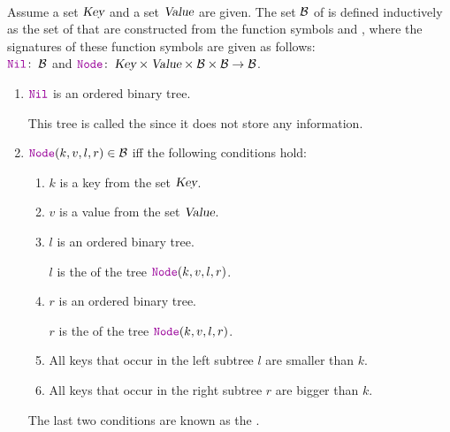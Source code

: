 \begin{Definition}  \hspace*{\fill} \\
  Assume a set $\textsl{Key}$ and a set $\textsl{Value}$ are given.
  The set $\mathcal{B}$ of   is defined
  inductively as the set of  that are constructed from the function symbols  and
  , where the signatures of these function symbols are given as follows: \\[0.2cm]
  \hspace*{1.3cm} 
  $\mytt{Nil}\!:\; \Bin$ \qquad and \qquad  $\mytt{Node}\!:\; \textsl{Key} \times \textsl{Value} \times \Bin \times \Bin \rightarrow \Bin$.
  \begin{enumerate}
  \item $\mytt{Nil}$ is an ordered binary tree. 

        This tree is called the   since it does not store any information.
  \item $\mytt{Node}(k, v, l, r) \in \Bin$ \quad iff the following conditions hold: 
        \begin{enumerate}
        \item $k$ is a key from the set $\textsl{Key}$.
        \item $v$ is a value from the set $\textsl{Value}$.
        \item $l$ is an ordered binary tree.

              $l$ is the    of the tree $\mytt{Node}(k, v, l, r)$.
        \item $r$ is an ordered binary tree.

              $r$ is the   of the tree $\mytt{Node}(k, v, l, r)$.
        \item All keys that occur in the left subtree $l$ are smaller than $k$.
        \item All keys that occur in the right subtree $r$ are bigger than $k$.
        \end{enumerate}
        The last two conditions are known as the . 
        \eox
\end{enumerate}
\end{Definition}

